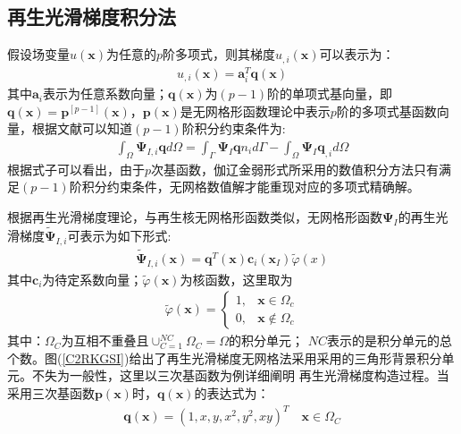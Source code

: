 \subsection{再生光滑梯度积分法}
假设场变量$u(\pmb x)$为任意的$p$阶多项式，则其梯度$u_{,i}(\pmb x)$可以表示为：
\begin{equation}
\begin{split}
    u_{,i}(\pmb x)=\pmb a_i^T\pmb q(\pmb x)
\end{split}
\end{equation}
其中$\pmb a_i$表示为任意系数向量；$\pmb q(\pmb x)$为$(p-1)$阶的单项式基向量，即$\pmb q(\pmb x)=\pmb p^{[p-1]}(\pmb x)$，$\pmb{p}(\pmb{x})$是无网格形函数理论中表示$p$阶的多项式基函数向量，根据文献可以知道$(p-1)$阶积分约束条件为:
\begin{equation}\label{p-1}
\begin{split}
    \int_{\Omega}\pmb \Psi_{I,i}\pmb qd\Omega=\int_{\Gamma}\pmb \Psi_I \pmb qn_id\Gamma-\int_{\Omega}\pmb \Psi_I\pmb q_{,i}d\Omega
\end{split}
\end{equation}
根据式子可以看出，由于$p$次基函数，伽辽金弱形式所采用的数值积分方法只有满足$(p-1)$阶积分约束条件，无网格数值解才能重现对应的多项式精确解。\par
根据再生光滑梯度理论，与再生核无网格形函数类似，无网格形函数$\pmb \Psi_I$的再生光滑梯度$\tilde{\pmb\Psi}_{I,i}$可表示为如下形式:
\begin{equation}\label{tildepsi}
\begin{split}
\tilde{\pmb \Psi}_{I,i}(\pmb x)=\pmb q^T(\pmb x)\pmb c_i(\pmb x_I)\tilde{\varphi}(x)
\end{split}
\end{equation}
其中$\pmb c_i$为待定系数向量；$\tilde{\varphi}(\pmb x)$为核函数，这里取为
\begin{equation}
\begin{split}
    \tilde{\varphi}(\pmb x)=\begin{cases}
        1,&\pmb x\in\Omega_c\\
        0,&\pmb x\notin\Omega_c\end{cases}
\end{split}
\end{equation}
其中：$\Omega_C$为互相不重叠且$\cup^{N\!C}_{C=1}\Omega_C=\Omega$的积分单元；
$N\!C$表示的是积分单元的总个数。图(\ref{C2RKGSI})给出了再生光滑梯度无网格法采用采用的三角形背景积分单元。不失为一般性，这里以三次基函数为例详细阐明
再生光滑梯度构造过程。当采用三次基函数$\pmb p(\pmb x)$时，$\pmb q(\pmb x)$的表达式为：
\begin{equation}\label{qx}
\begin{split}
    \pmb q(\pmb x)=(1,x,y,x^2,y^2,xy)^T\quad\pmb x\in\Omega_C
\end{split}
\end{equation}
